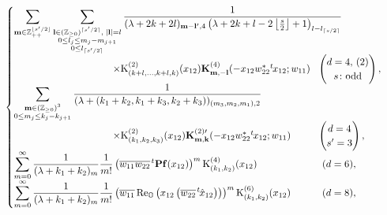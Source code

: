 \documentclass[pdftex]{sigma}
\numberwithin{equation}{section}
\newcommand{\ds}{\displaystyle}
\newcommand{\bK}{\mathbf{K}}
\newcommand{\bk}{\mathbf{k}}
\newcommand{\bl}{\mathbf{l}}
\newcommand{\bm}{\mathbf{m}}
\newcommand{\BZ}{\mathbb{Z}}
\newcommand{\BO}{\mathbb{O}}
\newcommand{\rK}{\mathrm{K}}
\renewcommand{\Re}{\operatorname{Re}}
\begin{document}
\begin{align*}
& \hphantom{=} \begin{cases}
\ds \sum_{\bm\in\BZ_{++}^{\lfloor s'/2\rfloor}}
\sum_{\substack{\bl\in(\BZ_{\ge 0})^{\lceil s'/2\rceil},\; |\bl|=l\\ 0\le l_j\le m_j-m_{j+1}\\ 0\le l_{\lceil s'/2\rceil}}}
\frac{1}{(\lambda+2k+2l)_{\bm-\bl',4}\left(\lambda+2k+l-2\left\lfloor\frac{s}{2}\right\rfloor+1\right)_{l-l_{\lceil s/2\rceil}}}\hspace{-30pt}\\
\hspace{100pt}\times \rK_{(k+l,\ldots,k+l,k)}^{(2)}(x_{12})
\bK_{\bm,-\bl}^{(4)}(-x_{12}w_{22}^*{}^t\hspace{-1pt}x_{12};w_{11})
& \!\!\begin{pmatrix}d=4,\,(2)\\s\colon \text{odd}\end{pmatrix},\\
\ds \sum_{\substack{\bm\in(\BZ_{\ge 0})^3\\ 0\le m_j\le k_j-k_{j+1}}}
\frac{1}{(\lambda+(k_1+k_2,k_1+k_3,k_2+k_3))_{(m_3,m_2,m_1),2}} \\
\hspace{100pt}\times\rK_{(k_1,k_2,k_3)}^{(2)}(x_{12})\bK_{\bm,\bk}^{(2)\prime}(-x_{12}w_{22}^*{}^t\hspace{-1pt}x_{12};w_{11})
& \!\!\begin{pmatrix}d=4\\ s'=3\end{pmatrix},\\
\ds \sum_{m=0}^\infty \frac{1}{(\lambda+k_1+k_2)_m}\frac{1}{m!}\left(\overline{w_{11}}\overline{w_{22}}
\hspace{1pt}{}^t\mathbf{Pf}(x_{12})\right)^m\rK_{(k_1,k_2)}^{(4)}(x_{12}) & (d=6),\\
\ds \sum_{m=0}^\infty \frac{1}{(\lambda+k_1+k_2)_m}\frac{1}{m!}\left(\overline{w_{11}}
\Re_\BO\left(x_{12}\left(\overline{w_{22}}\hspace{1pt}{}^t\hspace{-1pt}\hat{x}_{12}\right)\right)\right)^m\rK_{(k_1,k_2)}^{(6)}(x_{12}) & (d=8),
\end{cases}
\end{align*}
\end{document}
